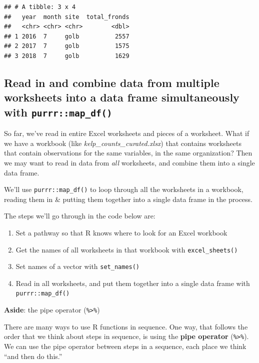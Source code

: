 \documentclass[]{book}
\providecommand{\tightlist}{%
  \setlength{\itemsep}{0pt}\setlength{\parskip}{0pt}}
\begin{document}
\begin{verbatim}
## # A tibble: 3 x 4
##   year  month site  total_fronds
##   <chr> <chr> <chr>        <dbl>
## 1 2016  7     golb          2557
## 2 2017  7     golb          1575
## 3 2018  7     golb          1629
\end{verbatim}

\hypertarget{read-in-and-combine-data-from-multiple-worksheets-into-a-data-frame-simultaneously-with-purrrmap_df}{%
\subsection{\texorpdfstring{Read in and combine data from multiple worksheets into a data frame simultaneously with \texttt{purrr::map\_df()}}{Read in and combine data from multiple worksheets into a data frame simultaneously with purrr::map\_df()}}\label{read-in-and-combine-data-from-multiple-worksheets-into-a-data-frame-simultaneously-with-purrrmap_df}}

So far, we've read in entire Excel worksheets and pieces of a worksheet. What if we have a workbook (like \emph{kelp\_counts\_curated.xlsx}) that contains worksheets that contain observations for the same variables, in the same organization? Then we may want to read in data from \emph{all} worksheets, and combine them into a single data frame.

We'll use \texttt{purrr::map\_df()} to loop through all the worksheets in a workbook, reading them in \& putting them together into a single data frame in the process.

The steps we'll go through in the code below are:

\begin{enumerate}
\def\labelenumi{\arabic{enumi}.}
\tightlist
\item
  Set a pathway so that R knows where to look for an Excel workbook
\item
  Get the names of all worksheets in that workbook with \texttt{excel\_sheets()}
\item
  Set names of a vector with \texttt{set\_names()}
\item
  Read in all worksheets, and put them together into a single data frame with \texttt{purrr::map\_df()}
\end{enumerate}

\textbf{Aside}: the pipe operator (\texttt{\%\textgreater{}\%})

There are many ways to use R functions in sequence. One way, that follows the order that we think about steps in sequence, is using the \textbf{pipe operator} (\texttt{\%\textgreater{}\%}). We can use the pipe operator between steps in a sequence, each place we think ``and then do this.''
\end{document}

